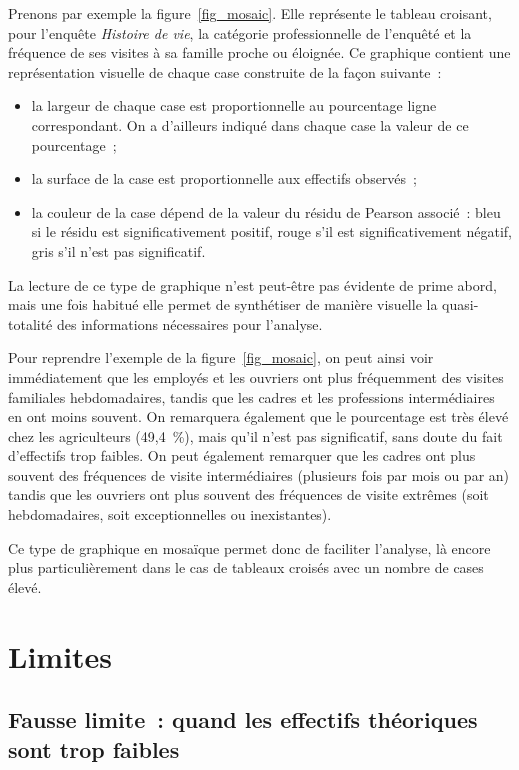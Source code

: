 \documentclass[a4paper,10pt,twoside,francais]{report}
\begin{document}
Prenons par exemple la figure~\vref{fig_mosaic}. Elle représente le
tableau croisant, pour l'enquête \textit{Histoire de vie}, la
catégorie professionnelle de l'enquêté et la fréquence de ses visites
à sa famille proche ou éloignée. Ce graphique contient une
représentation visuelle de chaque case construite de la façon
suivante~:

\begin{itemize}
\item la largeur de chaque case est proportionnelle au pourcentage
  ligne correspondant. On a d'ailleurs indiqué dans chaque case la
  valeur de ce pourcentage~;
\item la surface de la case est proportionnelle aux effectifs observés~;
\item la couleur de la case dépend de la valeur du résidu de Pearson
  associé~: bleu si le résidu est significativement positif, rouge
  s'il est significativement négatif, gris s'il n'est pas
  significatif.
\end{itemize}

La lecture de ce type de graphique n'est peut-être pas évidente de
prime abord, mais une fois habitué elle permet de synthétiser de
manière visuelle la quasi-totalité des informations nécessaires pour
l'analyse.

Pour reprendre l'exemple de la figure~\ref{fig_mosaic}, on peut ainsi
voir immédiatement que les employés et les ouvriers ont plus
fréquemment des visites familiales hebdomadaires, tandis que les
cadres et les professions intermédiaires en ont moins souvent. On
remarquera également que le pourcentage est très élevé chez les
agriculteurs (49,4~\%), mais qu'il n'est pas significatif, sans doute
du fait d'effectifs trop faibles. On peut également remarquer que les
cadres ont plus souvent des fréquences de visite intermédiaires
(plusieurs fois par mois ou par an) tandis que les ouvriers ont plus
souvent des fréquences de visite \og extrêmes \fg{} (soit hebdomadaires,
soit exceptionnelles ou inexistantes).

Ce type de graphique en mosaïque permet donc de faciliter l'analyse,
là encore plus particulièrement dans le cas de tableaux croisés avec
un nombre de cases élevé.


\chapter{Limites}
\label{sec-limites}

\section{Fausse limite~: quand les effectifs théoriques sont trop faibles}
\label{ssec-efffaibles}
\end{document}
